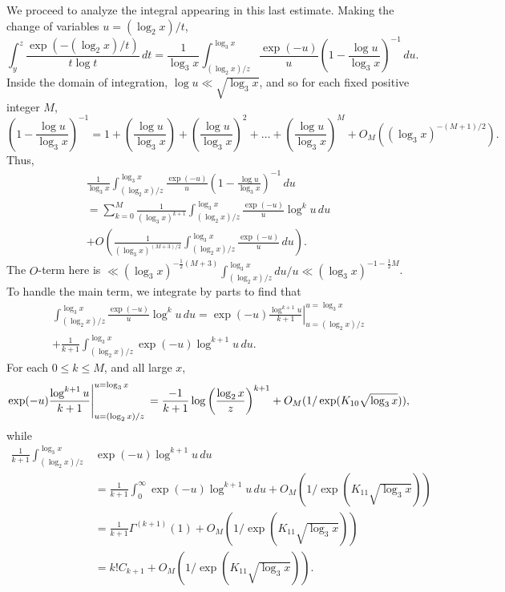 \documentclass[11pt]{amsart}
\theoremstyle{remark}
\begin{document}
We proceed to analyze the integral appearing in this last estimate. Making the change of variables $u=(\log_2 x)/t$,
\[ \int_{y}^{z} \frac{\exp(-(\log_2 x)/t)}{t\log{t}} \,dt = \frac{1}{\log_3 x}\int_{(\log_2 x)/z}^{\log_3{x}} \frac{\exp(-u)}{u}\left(1-\frac{\log{u}}{\log_3 x}\right)^{-1}\, du.\]
Inside the domain of integration, $\log{u} \ll \sqrt{\log_3 x}$, and so for each fixed positive integer $M$,
\[ \left(1-\frac{\log{u}}{\log_3 x}\right)^{-1} = 1 +\left(\frac{\log{u}}{\log_3 x}\right)+\left(\frac{\log{u}}{\log_3 x}\right)^2+\dots + \left(\frac{\log{u}}{\log_3 x}\right)^M + O_M((\log_3 x)^{-(M+1)/2}).\]
Thus,
\begin{multline*} \frac{1}{\log_3 x}\int_{(\log_2 x)/z}^{\log_3{x}} \frac{\exp(-u)}{u}\left(1-\frac{\log{u}}{\log_3 x}\right)^{-1}\, du \\ = \sum_{k=0}^{M} \frac{1}{(\log_3 x)^{k+1}} \int_{(\log_2 x)/z}^{\log_3{x}} \frac{\exp(-u)}{u} \log^{k}{u}\, du \\+ O\left(\frac{1}{(\log_3 x)^{(M+3)/2}} \int_{(\log_2{x})/z}^{\log_3{x}} \frac{\exp(-u)}{u}\, du\right).
\end{multline*}
The $O$-term here is $\ll (\log_3 x)^{-\frac{1}{2}(M+3)} \int_{(\log_2 x)/z}^{\log_3 x} du/u \ll (\log_3 x)^{-1-\frac{1}{2}M}$. To handle the main term, we integrate by parts to find that
\begin{multline*} \int_{(\log_2 x)/z}^{\log_3{x}} \frac{\exp(-u)}{u} \log^{k}{u}\, du  = \left.\exp(-u)\frac{\log^{k+1}{u}}{k+1}\right|_{u=(\log_2 x)/z}^{u=\log_3 x} \\ + \frac{1}{k+1}\int_{(\log_2 x)/z}^{\log_3 x} \exp(-u)\log^{k+1}{u}\, du.\end{multline*}
For each $0 \le k \le M$, and all large $x$,
\[ \left.\exp(-u)\frac{\log^{k+1}{u}}{k+1}\right|_{u=(\log_2 x)/z}^{u=\log_3 x} \\
= \frac{-1}{k+1}\log\left(\frac{\log_2 x}{z}\right)^{k+1} + O_M(1/\exp(K_{10}\sqrt{\log_3 x})), \]
while
\begin{align*} \frac{1}{k+1}\int_{(\log_2 x)/z}^{\log_3 x} &\exp(-u)\log^{k+1}{u}\, du \\
&= \frac{1}{k+1}\int_{0}^{\infty} \exp(-u)\log^{k+1}{u} \, du + O_M(1/\exp(K_{11}\sqrt{\log_3 x})) \\
&= \frac{1}{k+1} \Gamma^{(k+1)}(1) + O_M(1/\exp(K_{11}\sqrt{\log_3 x})) \\ &= k! C_{k+1} + O_M(1/\exp(K_{11}\sqrt{\log_3 x})). \end{align*}
\end{document}
